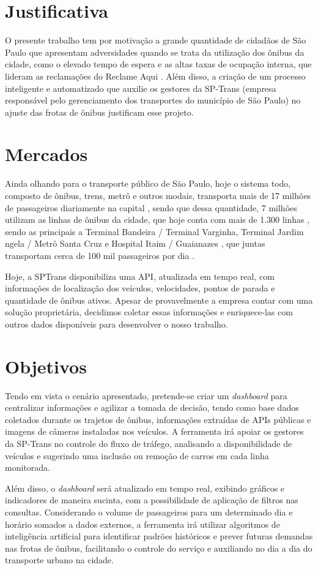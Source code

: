 \section{Justificativa}
\indent
\par O presente trabalho tem por motivação a grande quantidade de cidadãos de São Paulo que apresentam adversidades quando se trata da utilização dos ônibus da cidade, como o elevado tempo de espera e as altas taxas de ocupação interna, que lideram as reclamações do Reclame Aqui \cite{ReclameAqui1} \cite{ReclameAqui2}. Além disso, a criação de um processo inteligente e automatizado que auxilie os gestores da SP-Trans (empresa responsável pelo gerenciamento dos transportes do município de São Paulo) no ajuste das frotas de ônibus justificam esse projeto.

\section{Mercados}
\indent
\par Ainda olhando para o transporte público de São Paulo, hoje o sistema todo, composto de ônibus, trens, metrô e outros modais, transporta mais de 17 milhões de passageiros diariamente na capital \cite{G1SaoPaulo}, sendo que dessa quantidade, 7 milhões utilizam as linhas de ônibus da cidade, que hoje conta com mais de 1.300 linhas \cite{MobilidadeSampa}, sendo as principais a Terminal Bandeira / Terminal Varginha, Terminal Jardim  ngela / Metrô Santa Cruz e Hospital Itaim / Guaianazes , que juntas transportam cerca de 100 mil passageiros por dia \cite{Viatrolebus}.
\par Hoje, a SPTrans disponibiliza uma API, atualizada em tempo real, com informações de localização dos veículos, velocidades, pontos de parada e quantidade de ônibus ativos. Apesar de provavelmente a empresa contar com uma solução proprietária, decidimos coletar essas informações e enriquece-las com outros dados disponíveis para desenvolver o nosso trabalho.

\section{Objetivos}
\indent
\par Tendo em vista o cenário apresentado, pretende-se criar um \textit{dashboard} para centralizar informações e agilizar a tomada de decisão, tendo como base dados coletados durante os trajetos de ônibus, informações extraídas de APIs públicas e imagens de câmeras instaladas nos veículos. A ferramenta irá apoiar os gestores da SP-Trans no controle do fluxo de tráfego, analisando a disponibilidade de veículos e sugerindo uma inclusão ou remoção de carros em cada linha monitorada.
\par Além disso, o \textit{dashboard} será atualizado em tempo real, exibindo gráficos e indicadores de maneira sucinta, com a possibilidade de aplicação de filtros nas consultas. Considerando o volume de passageiros para um determinado dia e horário somados a dados externos, a ferramenta irá utilizar algoritmos de inteligência artificial para identificar padrões históricos e prever futuras demandas nas frotas de ônibus, facilitando o controle do serviço e auxiliando no dia a dia do transporte urbano na cidade.


